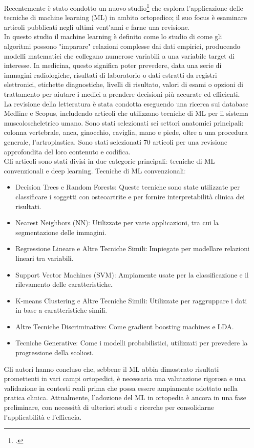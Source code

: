 Recentemente è stato condotto un nuovo studio\footcite{womak:machine-learning-in-orthopedics} che esplora l'applicazione delle tecniche di machine learning (ML) in ambito ortopedico; il suo focus è esaminare articoli pubblicati negli ultimi vent'anni e farne una revisione.\\
In questo studio il machine learning è definito come lo studio di come gli algoritmi possono "imparare" relazioni complesse dai dati empirici, producendo modelli matematici che collegano numerose variabili a una variabile target di interesse. In medicina, questo significa poter prevedere, data una serie di immagini radiologiche, risultati di laboratorio o dati estratti da registri elettronici, etichette diagnostiche, livelli di risultato, valori di esami o opzioni di trattamento per aiutare i medici a prendere decisioni più accurate ed efficienti.\\
La revisione della letteratura è stata condotta eseguendo una ricerca sui database Medline e Scopus, includendo articoli che utilizzano tecniche di ML per il sistema muscoloscheletrico umano. Sono stati selezionati sei settori anatomici principali: colonna vertebrale, anca, ginocchio, caviglia, mano e piede, oltre a una procedura generale, l'artroplastica. Sono stati selezionati 70 articoli per una revisione approfondita del loro contenuto e codifica.\\
Gli articoli sono stati divisi in due categorie principali: tecniche di ML convenzionali e deep learning.
Tecniche di ML convenzionali:
\begin{itemize}
\item Decision Trees e Random Forests: Queste tecniche sono state utilizzate per classificare i soggetti con osteoartrite e per fornire interpretabilità clinica dei risultati.
\item Nearest Neighbors (NN): Utilizzate per varie applicazioni, tra cui la segmentazione delle immagini.
\item Regressione Lineare e Altre Tecniche Simili: Impiegate per modellare relazioni lineari tra variabili.
\item Support Vector Machines (SVM): Ampiamente usate per la classificazione e il rilevamento delle caratteristiche.
\item K-means Clustering e Altre Tecniche Simili: Utilizzate per raggruppare i dati in base a caratteristiche simili.
\item Altre Tecniche Discriminative: Come gradient boosting machines e LDA.
\item Tecniche Generative: Come i modelli probabilistici, utilizzati per prevedere la progressione della scoliosi.
\end{itemize}
Gli autori hanno concluso che, sebbene il ML abbia dimostrato risultati promettenti in vari campi ortopedici, è necessaria una valutazione rigorosa e una validazione in contesti reali prima che possa essere ampiamente adottato nella pratica clinica. Attualmente, l'adozione del ML in ortopedia è ancora in una fase preliminare, con necessità di ulteriori studi e ricerche per consolidarne l'applicabilità e l'efficacia.


